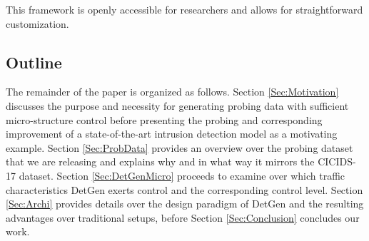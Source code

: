\documentclass[runningheads]{llncs}
\begin{document}
%
%
%
%
%
%


This framework is openly accessible for researchers and allows for straightforward customization.


\subsection{Outline}

The remainder of the paper is organized as follows. Section \ref{Sec:Motivation} discusses the purpose and necessity for generating probing data with sufficient micro-structure control before presenting the probing and corresponding improvement of a state-of-the-art intrusion detection model as a motivating example. Section \ref{Sec:ProbData} provides an overview over the probing dataset that we are releasing and explains why and in what way it mirrors the CICIDS-17 dataset. Section \ref{Sec:DetGenMicro} proceeds to examine over which traffic characteristics DetGen exerts control and the corresponding control level.
Section \ref{Sec:Archi} provides details over the design paradigm of DetGen and the resulting advantages over traditional setups, before Section \ref{Sec:Conclusion} concludes our work.
\end{document}
